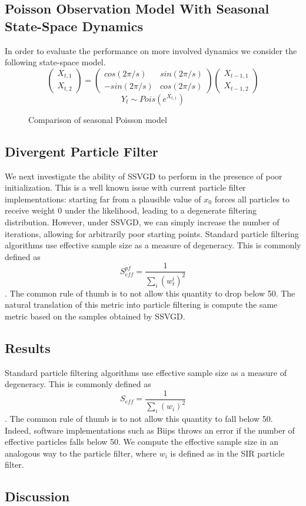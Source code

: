 \documentclass{article}
\begin{document}
\subsection*{Poisson Observation Model With Seasonal State-Space Dynamics}

In order to evaluate the performance on more involved dynamics we consider the following state-space model.
$$\begin{pmatrix} X_{t,1} \\ X_{t,2} \end{pmatrix} = \begin{pmatrix} cos(2\pi/s) & sin(2\pi/s) \\ -sin(2\pi/s) & cos(2\pi/s) \end{pmatrix} \begin{pmatrix} X_{t-1,1} \\ X_{t-1,2} \end{pmatrix} $$
$$Y_t \sim Pois(e^{X_{t,1}})$$


\begin{figure}[!tbp]
\centering
{}
  \hfill
  \caption{Comparison of seasonal Poisson model}
\end{figure}

\subsection*{Divergent Particle Filter}

We next investigate the ability of SSVGD to perform in the presence of poor initialization. This is a well known issue with current particle filter implementations: starting far from a plausible value of $x_0$ forces all particles to receive weight $0$ under the likelihood, leading to a degenerate filtering distribution. However, under SSVGD, we can simply increase the number of iterations, allowing for arbitrarily poor starting points. Standard particle filtering algorithms use effective sample size as a measure of degeneracy. This is commonly defined as $$S^{pf}_{eff} = \frac{1}{\sum_i (w_t^i)^2}$$. The common rule of thumb is to not allow this quantity to drop below 50. The natural translation of this metric into particle filtering is compute the same metric based on the samples obtained by SSVGD. 


\subsection*{Results}
Standard particle filtering algorithms use effective sample size as a measure of degeneracy. This is commonly defined as $$S_{eff} = \frac{1}{\sum_i (w_i)^2}$$. The common rule of thumb is to not allow this quantity to fall below 50. Indeed, software implementations such as Biips throws an error if the number of effective particles falls below 50. We compute the effective sample size in an analogous way to the particle filter, where $w_i$ is defined as in the SIR particle filter. 

\subsection*{Discussion}

\cite{liu_stein_2016-4}


\printbibliography
\end{document}
